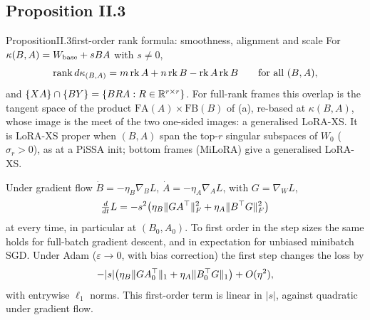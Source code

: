 \subsection{Proposition II.3}\label{proof:II.3}

\begin{restate}{Proposition}{II.3}{first-order rank formula: smoothness, alignment and scale}
For $\kappa(B,A)=W_{\rm base}+sBA$ with $s\ne0$,
\begin{equation*}
  \operatorname{rank} d\kappa_{(B,A)}=m\operatorname{rk}A+n\operatorname{rk}B-\operatorname{rk}A\operatorname{rk}B\qquad\text{for all }(B,A),
\end{equation*}
and $\{XA\}\cap\{BY\}=\{BRA:R\in\mathbb{R}^{r\times r}\}$. For full-rank frames this overlap is the tangent space of the product
$\mathrm{FA}(A)\times\mathrm{FB}(B)$ of (a), re-based at $\kappa(B,A)$, whose image is the meet
of the two one-sided images: a generalised LoRA-XS. It is LoRA-XS proper when $(B,A)$ span the top-$r$ singular subspaces
of $W_0$ ($\sigma_r>0$), as at a PiSSA init; bottom frames (MiLoRA) give a generalised LoRA-XS.

Under gradient flow $\dot B=-\eta_B\nabla_BL$, $\dot A=-\eta_A\nabla_AL$, with $G=\nabla_WL$,
\begin{equation*}
  \tfrac{d}{dt}L=-s^2\big(\eta_B\|GA^{\top}\|_F^2+\eta_A\|B^{\top} G\|_F^2\big)
\end{equation*}
at every time, in particular at $(B_0,A_0)$. To first order in the step sizes the same holds for full-batch gradient
descent, and in expectation for unbiased minibatch SGD. Under Adam ($\varepsilon\to0$, with bias correction) the first
step changes the loss by
\begin{equation*}
  -\lvert s\rvert\big(\eta_B\|GA_0^{\top}\|_1+\eta_A\|B_0^{\top} G\|_1\big)+O(\eta^2),
\end{equation*}
with entrywise $\ell_1$ norms. This first-order term is linear in $\lvert s\rvert$, against quadratic under gradient flow.
\end{restate}

